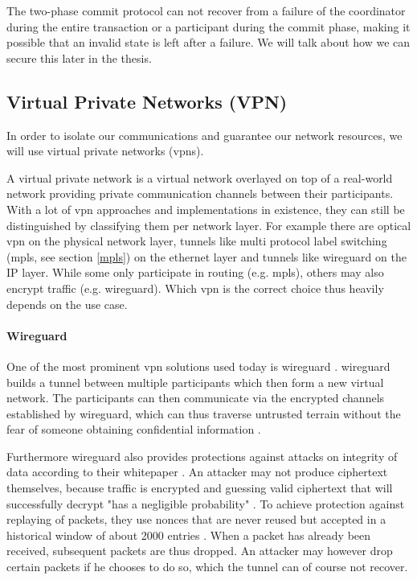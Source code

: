 The two-phase commit protocol can not recover from a failure of the coordinator during the entire transaction or a participant during the commit phase, making it possible that an invalid state is left after a failure. We will talk about how we can secure this later in the thesis.

\subsection{Virtual Private Networks (VPN)}
In order to isolate our communications and guarantee our network resources, we will use virtual private networks (\acrshort{vpn}s).

A virtual private network \cite{vpn} is a virtual network overlayed on top of a real-world network providing private communication channels between their participants. With a lot of \acrshort{vpn} approaches and implementations in existence, they can still be distinguished by classifying them per network layer. For example there are optical \acrshort{vpn} on the physical network layer, tunnels like multi protocol label switching (\acrshort{mpls}, see section \ref{mpls}) on the ethernet layer and tunnels like \gls{wireguard} \cite{wireguard} on the IP layer. While some only participate in routing (e.g. \acrshort{mpls}), others may also encrypt traffic (e.g. \gls{wireguard}). Which \acrshort{vpn} is the correct choice thus heavily depends on the use case.

\paragraph{Wireguard} One of the most prominent \acrshort{vpn} solutions used today is \gls{wireguard} \cite{wireguard}. \Gls{wireguard} builds a tunnel between multiple participants which then form a new virtual network. The participants can then communicate via the encrypted channels established by \gls{wireguard}, which can thus traverse untrusted terrain without the fear of someone obtaining confidential information \cite{wireguard}.

Furthermore \gls{wireguard} also provides protections against attacks on integrity of data according to their whitepaper \cite{wireguard}. An attacker may not produce ciphertext themselves, because traffic is encrypted and guessing valid ciphertext that will successfully decrypt "has a negligible probability" \cite{wireguardcrypto}. To achieve protection against replaying of packets, they use nonces that are never reused but accepted in a historical window of about 2000 entries \cite{wireguardproto}. When a packet has already been received, subsequent packets are thus dropped. An attacker may however drop certain packets if he chooses to do so, which the tunnel can of course not recover.

